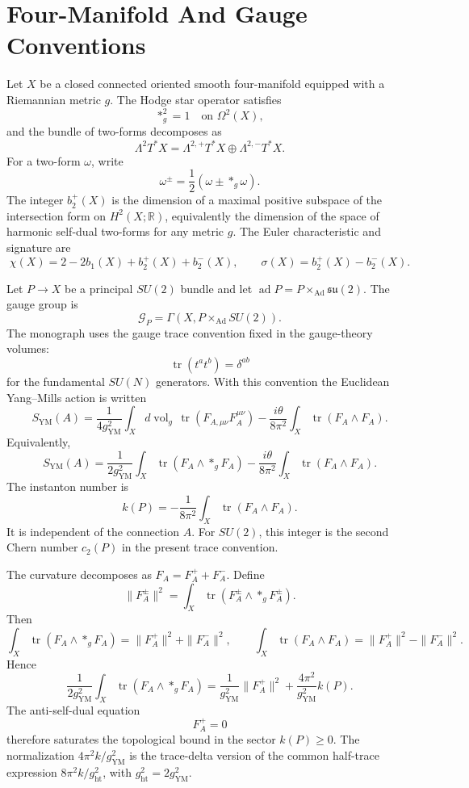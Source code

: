 \section{Four-Manifold And Gauge Conventions}

Let \(X\) be a closed connected oriented smooth four-manifold equipped with a
Riemannian metric \(g\).  The Hodge star operator satisfies
\[
  *_g^2=1\quad\text{on }\Omega^2(X),
\]
and the bundle of two-forms decomposes as
\[
  \Lambda^2T^*X=\Lambda^{2,+}T^*X\oplus\Lambda^{2,-}T^*X .
\]
For a two-form \(\omega\), write
\[
  \omega^\pm=\frac{1}{2}(\omega\pm *_g\omega).
\]
The integer \(b_2^+(X)\) is the dimension of a maximal positive subspace of
the intersection form on \(H^2(X;\mathbb R)\), equivalently the dimension of
the space of harmonic self-dual two-forms for any metric \(g\).  The Euler
characteristic and signature are
\[
  \chi(X)=2-2b_1(X)+b_2^+(X)+b_2^-(X),
  \qquad
  \sigma(X)=b_2^+(X)-b_2^-(X).
\]

Let \(P\to X\) be a principal \(SU(2)\) bundle and let
\(\operatorname{ad}P=P\times_{\operatorname{Ad}}\mathfrak{su}(2)\).  The
gauge group is
\[
  \mathcal G_P=\Gamma(X,P\times_{\operatorname{Ad}}SU(2)).
\]
The monograph uses the gauge trace convention fixed in the gauge-theory
volumes:
\[
  \operatorname{tr}(t^at^b)=\delta^{ab}
\]
for the fundamental \(SU(N)\) generators.  With this convention the Euclidean
Yang--Mills action is written
\[
  S_{\mathrm{YM}}(A)
  =
  \frac{1}{4g_{\mathrm{YM}}^2}
  \int_X d\operatorname{vol}_g\,
  \operatorname{tr}(F_{A,\mu\nu}F_A^{\mu\nu})
  -\frac{i\theta}{8\pi^2}\int_X\operatorname{tr}(F_A\wedge F_A).
\]
Equivalently,
\[
  S_{\mathrm{YM}}(A)
  =
  \frac{1}{2g_{\mathrm{YM}}^2}
  \int_X\operatorname{tr}(F_A\wedge *_gF_A)
  -\frac{i\theta}{8\pi^2}\int_X\operatorname{tr}(F_A\wedge F_A).
\]
The instanton number is
\[
  k(P)
  =
  -\frac{1}{8\pi^2}\int_X\operatorname{tr}(F_A\wedge F_A).
\]
It is independent of the connection \(A\).  For \(SU(2)\), this integer is
the second Chern number \(c_2(P)\) in the present trace convention.

The curvature decomposes as \(F_A=F_A^+ + F_A^-\).  Define
\[
  \|F_A^\pm\|^2=\int_X\operatorname{tr}(F_A^\pm\wedge *_gF_A^\pm).
\]
Then
\[
  \int_X\operatorname{tr}(F_A\wedge *_gF_A)
  =
  \|F_A^+\|^2+\|F_A^-\|^2,
  \qquad
  \int_X\operatorname{tr}(F_A\wedge F_A)
  =
  \|F_A^+\|^2-\|F_A^-\|^2.
\]
Hence
\[
  \frac{1}{2g_{\mathrm{YM}}^2}
  \int_X\operatorname{tr}(F_A\wedge *_gF_A)
  =
  \frac{1}{g_{\mathrm{YM}}^2}\|F_A^+\|^2
  +\frac{4\pi^2}{g_{\mathrm{YM}}^2}k(P).
\]
The anti-self-dual equation
\[
  F_A^+=0
\]
therefore saturates the topological bound in the sector \(k(P)\ge 0\).  The
normalization \(4\pi^2 k/g_{\mathrm{YM}}^2\) is the trace-delta version of
the common half-trace expression \(8\pi^2 k/g_{\mathrm{ht}}^2\), with
\(g_{\mathrm{ht}}^2=2g_{\mathrm{YM}}^2\).

